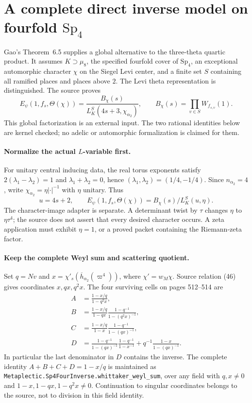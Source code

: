 \section{A complete direct inverse model on fourfold \(\mathrm{Sp}_4\)}
\label{sec:sp4-direct-inverse}

Gao's Theorem~6.5 \cite{GaoInverseEis} supplies a global alternative to
the three-theta quartic product. It assumes \(K\supset\mu_8\), the
specified fourfold cover of \(\mathrm{Sp}_4\), an exceptional automorphic
character \(\chi\) on the Siegel Levi center, and a finite set \(S\)
containing all ramified places and places above \(2\). The Levi theta
representation is distinguished. The source proves
\[
 E_\psi(1,f_s,\Theta(\chi))
 =\frac{B_\chi(s)}{L_K^S(4s+3,\chi_{\alpha_2})},
 \qquad B_\chi(s)=\prod_{v\in S}W_{f_{s,v}}(1).
\]
This global factorization is an external input. The two rational
identities below are kernel checked; no adelic or automorphic
formalization is claimed for them.

\paragraph{Normalize the actual \(L\)-variable first.}
For unitary central inducing data, the real torus exponents satisfy
\(2(\lambda_1-\lambda_2)=1\) and \(\lambda_1+\lambda_2=0\), hence
\((\lambda_1,\lambda_2)=(1/4,-1/4)\). Since \(n_{\alpha_2}=4\),
write \(\chi_{\alpha_2}=\eta|\cdot|^{-1}\) with \(\eta\) unitary. Thus
\[
 u=4s+2,\qquad E_\psi(1,f_s,\Theta(\chi))
                 =B_\chi(s)/L_K^S(u,\eta).
\]
The character-image adapter is separate. A determinant twist by \(\tau\)
changes \(\eta\) to \(\eta\tau^4\); the source does not assert that every
desired character occurs. A zeta application must exhibit \(\eta=1\),
or a proved packet containing the Riemann-zeta factor.

\paragraph{Keep the complete Weyl sum and scattering quotient.}
Set \(q=Nv\) and \(x=\chi'_s(\overline h_{\alpha_2}(\varpi^4))\), where
\(\chi'=w_M\chi\). Source relation (46) gives coordinates \(x,qx,q^2x\).
The four surviving cells on pages 512--514 are
\[
\begin{split}
 A&=\frac{1-x/q}{1-q^2x},\\
 B&=\frac{1-x/q}{1-qx}\frac{1-q^{-1}}{1-(q^2x)^{-1}},\\
 C&=\frac{1-x/q}{1-x}\frac{1-q^{-1}}{1-(qx)^{-1}},\\
 D&=\frac{1-q^{-1}}{1-(qx)^{-1}}
       \frac{1-q^{-1}}{1-x^{-1}}
       +q^{-1}\frac{1-x}{1-(qx)^{-1}}.
\end{split}
\]
In particular the last denominator in \(D\) contains the inverse.
The complete identity \(A+B+C+D=1-x/q\) is maintained as
\texttt{Metaplectic.Sp4FourInverse.whittaker\_weyl\_sum},
over any field with \(q,x\ne0\) and
\(1-x,1-qx,1-q^2x\ne0\). Continuation to singular coordinates belongs
to the source, not to division in this field identity.

